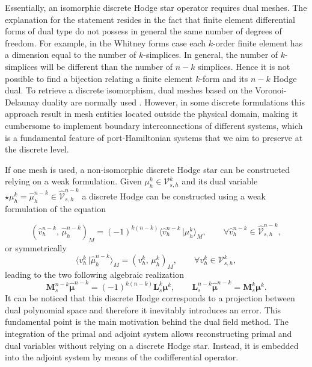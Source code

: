 \documentclass{elsarticle}
\newcommand{\revTwo}[1]{{\color{black}#1}}
\newcommand*{\dual}[1]{\ensuremath{\widehat{#1}}}
\newcommand{\inpr}[3][]{\ensuremath{( #2, \, #3 )_{#1}}}
\newcommand{\dualpr}[3][]{\ensuremath{\langle #2 \, \vert #3 \rangle_{#1}}}
\begin{document}
Essentially, an isomorphic discrete Hodge star operator requires dual meshes.
The explanation for the statement resides in the fact that finite element differential forms of dual type do not possess in general the same number of degrees of freedom. For example, in the Whitney forms case each $k$-order finite element has a dimension equal to the number of $k$-simplices. In general, the number of $k$-simplices will be different than the number of $n-k$ simplices. Hence it is not possible to find a bijection relating a finite element $k$-form and its $n-k$ Hodge dual. To retrieve a discrete isomorphism, dual meshes based on the Voronoi-Delaunay duality are normally used \cite{hirani2003discrete,hiptmair2001}. However,  \revTwo{in some discrete formulations} this approach result in mesh entities located outside the physical domain, making it cumbersome to implement boundary interconnections of different systems, which is a fundamental feature of port-Hamiltonian systems that we aim to preserve at the discrete level.

If one mesh is used, a non-isomorphic discrete Hodge star can be constructed relying on a weak formulation. Given $\mu_h^k \in \mathcal{V}_{s, h}^{k}$ and its dual variable $\star \mu_h^k = \dual{\mu}_h^{n-k} \in \dual{\mathcal{V}}_{s, h}^{n-k}$ a discrete Hodge can be constructed using a weak formulation of the equation 

\begin{equation}
    \inpr[M]{\dual{v}^{n-k}_h}{\dual{\mu}_h^{n-k}} = (-1)^{k(n-k)} \dualpr[M]{\dual{v}^{n-k}_h}{\mu_h^k}, \qquad \forall \dual{v}^{n-k}_h \in \dual{\mathcal{V}}_{s, h}^{n-k},
\end{equation}
or symmetrically
\begin{equation}
    \dualpr[M]{v^k_h}{\dual{\mu}_h^{n-k}} =\inpr[M]{v^k_h}{\mu_h^k}, \qquad \forall v^k_h \in \mathcal{V}_{s, h}^{k},
\end{equation}
leading to the two following algebraic realization
\begin{equation}\label{eq:alg_hodge}
    \mathbf{M}^{n-k}_s \dual{\bm{\mu}}^{n-k} = (-1)^{k(n-k)} \mathbf{L}^{k}_s {\bm{\mu}}^k, \qquad \mathbf{L}^{n-k}_s \dual{\bm{\mu}}^{n-k}  = \mathbf{M}^{k}_s \bm{\mu}^k.
\end{equation}
It can be noticed that this discrete Hodge corresponds to a projection between dual polynomial space and therefore it inevitably introduces an error. This fundamental point is the main motivation behind the dual field method. The integration of the primal and adjoint system allows reconstructing primal and dual variables without relying on a discrete Hodge star. Instead, it is embedded into the adjoint system by means of the codifferential operator.
\end{document}
